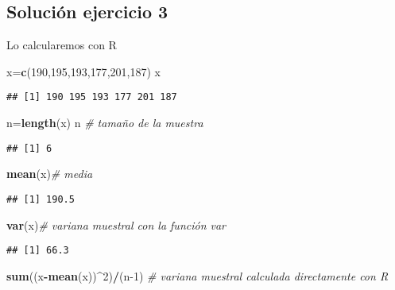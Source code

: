 \documentclass[]{article}
\newenvironment{Shaded}{\begin{snugshade}}{\end{snugshade}}
\newcommand{\CommentTok}[1]{\textcolor[rgb]{0.56,0.35,0.01}{\textit{#1}}}
\newcommand{\DecValTok}[1]{\textcolor[rgb]{0.00,0.00,0.81}{#1}}
\newcommand{\KeywordTok}[1]{\textcolor[rgb]{0.13,0.29,0.53}{\textbf{#1}}}
\newcommand{\NormalTok}[1]{#1}
\newcommand{\OperatorTok}[1]{\textcolor[rgb]{0.81,0.36,0.00}{\textbf{#1}}}
\begin{document}
\hypertarget{soluciuxf3n-ejercicio-3}{%
\subsection{Solución ejercicio 3}\label{soluciuxf3n-ejercicio-3}}

Lo calcularemos con R

\begin{Shaded}
\begin{Highlighting}[]
\NormalTok{x=}\KeywordTok{c}\NormalTok{(}\DecValTok{190}\NormalTok{,}\DecValTok{195}\NormalTok{,}\DecValTok{193}\NormalTok{,}\DecValTok{177}\NormalTok{,}\DecValTok{201}\NormalTok{,}\DecValTok{187}\NormalTok{)}
\NormalTok{x}
\end{Highlighting}
\end{Shaded}

\begin{verbatim}
## [1] 190 195 193 177 201 187
\end{verbatim}

\begin{Shaded}
\begin{Highlighting}[]
\NormalTok{n=}\KeywordTok{length}\NormalTok{(x)}
\NormalTok{n }\CommentTok{# tamaño de la muestra}
\end{Highlighting}
\end{Shaded}

\begin{verbatim}
## [1] 6
\end{verbatim}

\begin{Shaded}
\begin{Highlighting}[]
\KeywordTok{mean}\NormalTok{(x)}\CommentTok{# media}
\end{Highlighting}
\end{Shaded}

\begin{verbatim}
## [1] 190.5
\end{verbatim}

\begin{Shaded}
\begin{Highlighting}[]
\KeywordTok{var}\NormalTok{(x)}\CommentTok{# variana muestral con la función var}
\end{Highlighting}
\end{Shaded}

\begin{verbatim}
## [1] 66.3
\end{verbatim}

\begin{Shaded}
\begin{Highlighting}[]
\KeywordTok{sum}\NormalTok{((x}\OperatorTok{-}\KeywordTok{mean}\NormalTok{(x))}\OperatorTok{^}\DecValTok{2}\NormalTok{)}\OperatorTok{/}\NormalTok{(n}\DecValTok{-1}\NormalTok{) }\CommentTok{# variana muestral calculada directamente con R}
\end{Highlighting}
\end{Shaded}
\end{document}
